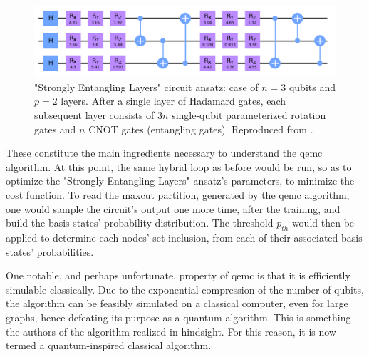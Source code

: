 \begin{figure}[H]
    \centering
    \includegraphics[width = 0.85\linewidth]{Figures/Diagrams/Strongly_Entangling_Layers.png}
    \caption{"Strongly Entangling Layers" circuit ansatz: case of $n = 3$ qubits and $p = 2$ layers. After a single layer of Hadamard gates, each subsequent layer consists of $3n$ single-qubit parameterized rotation gates and $n$ CNOT gates (entangling gates). Reproduced from \cite{tenecohen2023variational}.}
    \label{fig:Strongly_Entangling_Layers}
\end{figure}

These constitute the main ingredients necessary to understand the \acrshort{qemc} algorithm. At this point, the same hybrid loop as before would be run, so as to optimize the "Strongly Entangling Layers" ansatz's parameters, to minimize the cost function. To read the \acrshort{maxcut} partition, generated by the \acrshort{qemc} algorithm, one would sample the circuit's output one more time, after the training, and build the basis states' probability distribution. The threshold $p_{th}$ would then be applied to determine each nodes' set inclusion, from each of their associated basis states' probabilities.

One notable, and perhaps unfortunate, property of \acrshort{qemc} is that it is efficiently simulable classically. Due to the exponential compression of the number of qubits, the algorithm can be feasibly simulated on a classical computer, even for large graphs, hence defeating its purpose as a quantum algorithm. This is something the authors of the algorithm \cite{tenecohen2023variational} realized in hindsight. For this reason, it is now termed a quantum-inspired classical algorithm.





